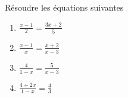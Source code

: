 
Résoudre les équations suivantes
\begin{enumerate}
\item $\frac{x-1}{2}=\frac{3x+2}{5}$
\item $\frac{x-1}{x}=\frac{x+2}{x-3}$
\item $\frac{4}{1-x}=\frac{5}{x-3}$
\item $\frac{4+2x}{1-x}=\frac{4}{3}$
\end{enumerate}